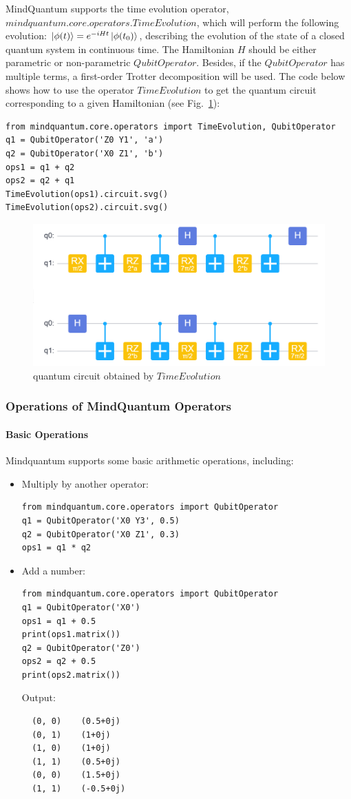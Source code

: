 MindQuantum supports the time evolution operator, $mindquantum.core.operators.TimeEvolution$, which will perform the following evolution: $\ket{\phi(t)} = e^{-iHt}\ket{\phi(t_0)}$, describing the evolution of the state of a closed quantum system in continuous time. The Hamiltonian $H$ should be either parametric or non-parametric $QubitOperator$. Besides, if the $QubitOperator$ has multiple terms, a first-order Trotter decomposition will be used. The code below shows how to use the operator $TimeEvolution$ to get the quantum circuit corresponding to a given Hamiltonian (see Fig.~\ref{2.5_TimeEvolution_circuit}): 
\begin{lstlisting}
from mindquantum.core.operators import TimeEvolution, QubitOperator
q1 = QubitOperator('Z0 Y1', 'a')
q2 = QubitOperator('X0 Z1', 'b')
ops1 = q1 + q2
ops2 = q2 + q1
TimeEvolution(ops1).circuit.svg()
TimeEvolution(ops2).circuit.svg()
\end{lstlisting}
\begin{figure}[h]
    \centering
    \includegraphics[width=0.7\linewidth]{2.5_figures/2.5_TimeEvolution_circuit.png}
    \caption{quantum circuit obtained by $TimeEvolution$}
    \label{2.5_TimeEvolution_circuit}
\end{figure}


\subsubsection{Operations of MindQuantum Operators}

\paragraph{Basic Operations}
Mindquantum supports some basic arithmetic operations, including:  
\begin{itemize}
    \item Multiply by another operator: 
    \begin{lstlisting}
from mindquantum.core.operators import QubitOperator
q1 = QubitOperator('X0 Y3', 0.5)
q2 = QubitOperator('X0 Z1', 0.3)
ops1 = q1 * q2
    \end{lstlisting}
    \item Add a number: 
    \begin{lstlisting}
from mindquantum.core.operators import QubitOperator
q1 = QubitOperator('X0')
ops1 = q1 + 0.5
print(ops1.matrix())
q2 = QubitOperator('Z0')
ops2 = q2 + 0.5
print(ops2.matrix())
    \end{lstlisting}
Output: 
\begin{lstlisting}
  (0, 0)	(0.5+0j)
  (0, 1)	(1+0j)
  (1, 0)	(1+0j)
  (1, 1)	(0.5+0j)
  (0, 0)	(1.5+0j)
  (1, 1)	(-0.5+0j)
\end{lstlisting}
\end{itemize}

